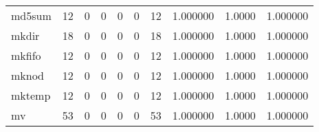 \begin{longtable}{lrrrrrrrrr}
md5sum    &                                       12 &                                                  0 &                                                  0 &                                                  0 &                                                  0 &                                                 12 &                                           1.000000 &                                 1.0000 &                             1.000000 \\
mkdir     &                                       18 &                                                  0 &                                                  0 &                                                  0 &                                                  0 &                                                 18 &                                           1.000000 &                                 1.0000 &                             1.000000 \\
mkfifo    &                                       12 &                                                  0 &                                                  0 &                                                  0 &                                                  0 &                                                 12 &                                           1.000000 &                                 1.0000 &                             1.000000 \\
mknod     &                                       12 &                                                  0 &                                                  0 &                                                  0 &                                                  0 &                                                 12 &                                           1.000000 &                                 1.0000 &                             1.000000 \\
mktemp    &                                       12 &                                                  0 &                                                  0 &                                                  0 &                                                  0 &                                                 12 &                                           1.000000 &                                 1.0000 &                             1.000000 \\
mv        &                                       53 &                                                  0 &                                                  0 &                                                  0 &                                                  0 &                                                 53 &                                           1.000000 &                                 1.0000 &                             1.000000 \\

\end{longtable}

